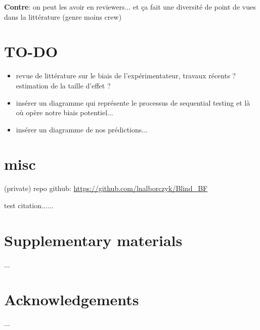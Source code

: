 \documentclass[a4paper,man,natbib]{apa6}
\begin{document}
\textbf{Contre}: on peut les avoir en reviewers... et ça fait une diversité de point de vues dans la littérature (genre moins crew)

\section{TO-DO}

\begin{itemize}

\item{revue de littérature sur le biais de l'expérimentateur, travaux récents ? estimation de la taille d'effet ?}

\item{insérer un diagramme qui représente le processus de sequential testing et là où opère notre biais potentiel...}

\item{insérer un diagramme de nos prédictions...}

\end{itemize}

\section{misc}

(private) repo github: \url{https://github.com/lnalborczyk/Blind_BF}

test citation...\cite{kruschke_bayesian_2017}...

\section{Supplementary materials}

...

\section{Acknowledgements}

...



\end{document}
